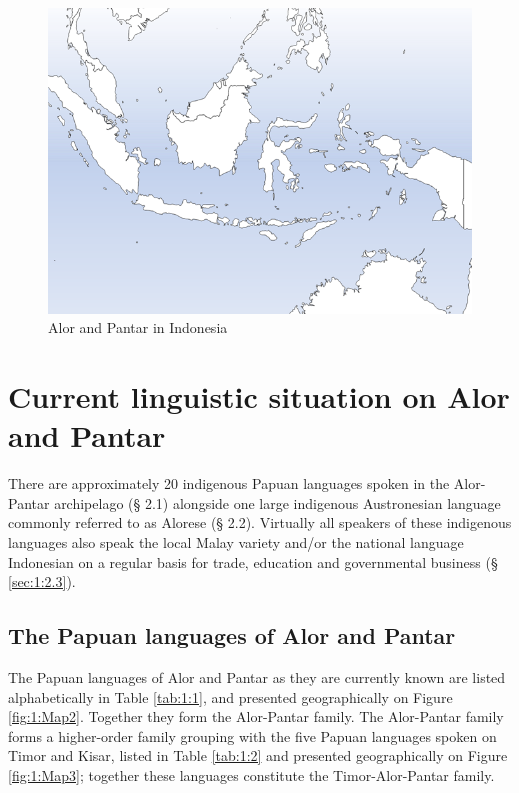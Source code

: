 \begin{figure}
\includegraphics[width=\textwidth]{figures/klamer_ch1_fig1.png}
\caption{Alor and Pantar in Indonesia}
\label{fig:1:Map1}
\end{figure}  



\section{Current linguistic situation on Alor and Pantar}\label{sec:1:2}
There are approximately 20 indigenous Papuan languages spoken in the Alor-Pantar archipelago ({\S} 2.1) alongside one large indigenous Austronesian language commonly referred to as Alorese ({\S} 2.2). Virtually all speakers of these indigenous languages also speak the local Malay variety and/or the national language Indonesian on a regular basis for trade, education and governmental business ({\S} \ref{sec:1:2.3}). 

\subsection{The Papuan languages of Alor and Pantar} \label{sec:1:2.1}
The Papuan languages of Alor and Pantar as they are currently known are listed alphabetically in Table \ref{tab:1:1}, and presented geographically on Figure \ref{fig:1:Map2}. Together they form the Alor-Pantar family. The Alor-Pantar family forms a higher-order family grouping with the five Papuan languages spoken on Timor and Kisar, listed in Table \ref{tab:1:2} and presented geographically on Figure \ref{fig:1:Map3}; together these languages constitute the Timor-Alor-Pantar family.

